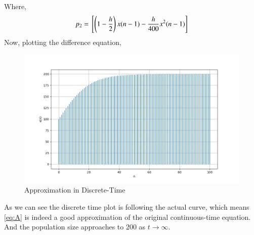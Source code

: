 \documentclass[journal,12pt,twocolumn]{IEEEtran}
\theoremstyle{remark}
\begin{document}
Where,
\begin{align}
    p_2={}\left[\left(1-\frac{h}{2}\right)x(n-1)-\frac{h}{400}x^2(n-1)\right]
\end{align}
Now, plotting the difference equation,
\begin{figure}[h]
    \centering
    \includegraphics[width=01.2\columnwidth]{figs/DT.png}
    \caption{Approximation in Discrete-Time}
\end{figure}
\newline
As we can see the discrete time plot is following the actual curve, which means \eqref{eq:A} is indeed a good approximation of the original continuous-time equation.
\newline
And the population size approaches to 200 as $t \rightarrow \infty$.
\end{document}
